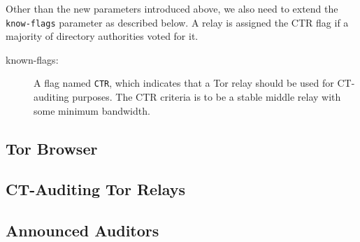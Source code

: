 Other than the new parameters introduced above, we also need to extend the
\texttt{know-flags} parameter as described below.  A relay is assigned the CTR
flag if a majority of directory authorities voted for it.
\begin{description}
	\item[known-flags:] A flag named \texttt{CTR}, which indicates
		that a Tor relay should be used for CT-auditing purposes.  The CTR
		criteria is to be a stable middle relay with some minimum bandwidth.
\end{description}

\subsection{Tor Browser}
\subsection{CT-Auditing Tor Relays}
\subsection{Announced Auditors}
